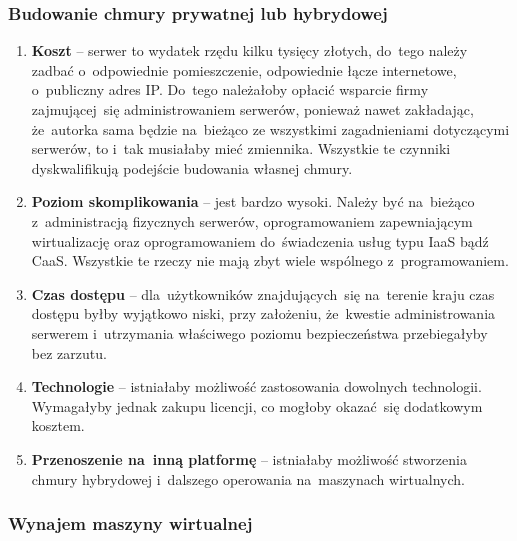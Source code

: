 \documentclass[12pt,a4paper,twoside,titlepage,openright]{book}
\begin{document}
\subsubsection{Budowanie chmury prywatnej lub hybrydowej}

\begin{enumerate}
	\item \textbf{Koszt} -- serwer to wydatek rzędu kilku tysięcy złotych, do~tego należy zadbać o~odpowiednie pomieszczenie, odpowiednie łącze internetowe, o~publiczny adres IP. Do~tego należałoby opłacić wsparcie firmy zajmującej~się administrowaniem serwerów, ponieważ nawet zakładając, że~autorka sama będzie na~bieżąco ze wszystkimi zagadnieniami dotyczącymi serwerów, to i~tak musiałaby mieć zmiennika. Wszystkie te czynniki dyskwalifikują podejście budowania własnej chmury. 
	\item \textbf{Poziom skomplikowania} -- jest bardzo wysoki. Należy być na~bieżąco z~administracją fizycznych serwerów, oprogramowaniem zapewniającym wirtualizację oraz oprogramowaniem do~świadczenia usług typu IaaS bądź CaaS. Wszystkie te rzeczy nie mają zbyt wiele wspólnego z~programowaniem.
	\item \textbf{Czas dostępu} -- dla~użytkowników znajdujących~się na~terenie kraju czas dostępu byłby wyjątkowo niski, przy założeniu, że~kwestie administrowania serwerem i~utrzymania właściwego poziomu bezpieczeństwa przebiegałyby bez zarzutu.
	\item \textbf{Technologie} -- istniałaby możliwość zastosowania dowolnych technologii. Wymagałyby jednak zakupu licencji, co mogłoby okazać~się dodatkowym kosztem.
	\item \textbf{Przenoszenie na~inną platformę} -- istniałaby możliwość stworzenia chmury hybrydowej i~dalszego operowania na~maszynach wirtualnych.
\end{enumerate}


\subsubsection{Wynajem maszyny wirtualnej}
\end{document}
